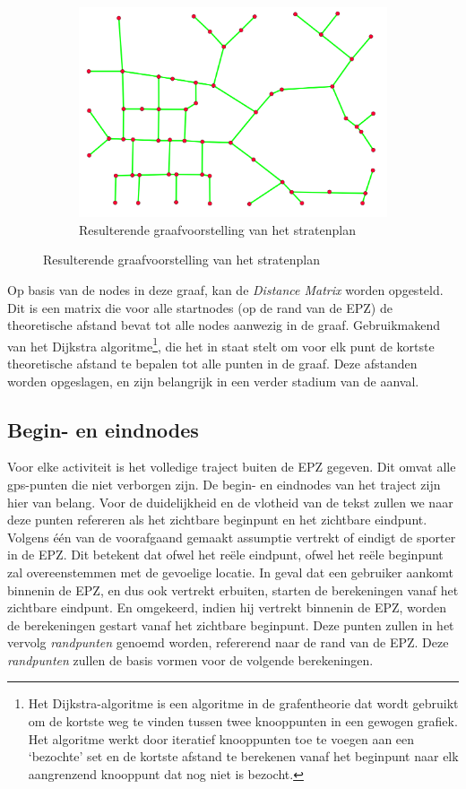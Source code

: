 \begin{figure}[h]
\begin{subfigure}[b]{.4\textwidth}
        \includegraphics[width=1\textwidth]{fig/RoadGraph/Graph.png}
        \caption{Resulterende graafvoorstelling van het stratenplan}
    \end{subfigure}
\end{figure}

Op basis van de nodes in deze graaf, kan de \textit{Distance Matrix} worden
opgesteld. Dit is een matrix die voor alle startnodes (op de rand van de
\ac{EPZ}) de theoretische afstand bevat tot alle nodes aanwezig in de graaf.
Gebruikmakend van het Dijkstra algoritme\footnote{Het Dijkstra-algoritme is een
    algoritme in de grafentheorie dat wordt gebruikt om de kortste weg te vinden
    tussen twee knooppunten in een gewogen grafiek. Het algoritme werkt door
    iteratief knooppunten toe te voegen aan een `bezochte' set en de kortste
    afstand te berekenen vanaf het beginpunt naar elk aangrenzend knooppunt dat nog
    niet is bezocht\cite{dijkstra}.}, die het in staat stelt om voor elk punt de
kortste theoretische afstand te bepalen tot alle punten in de graaf. Deze
afstanden worden opgeslagen, en zijn belangrijk in een verder stadium van de
aanval.

\subsection{Begin- en eindnodes}
Voor elke activiteit is het volledige traject buiten de \ac{EPZ} gegeven. Dit
omvat alle \ac{gps}-punten die niet verborgen zijn. De begin- en eindnodes van
het traject zijn hier van belang. Voor de duidelijkheid en de vlotheid van de
tekst zullen we naar deze punten refereren als het zichtbare beginpunt en het
zichtbare eindpunt. Volgens één van de voorafgaand gemaakt assumptie vertrekt
of eindigt de sporter in de \ac{EPZ}. Dit betekent dat ofwel het reële
eindpunt, ofwel het reële beginpunt zal overeenstemmen met de gevoelige
locatie. In geval dat een gebruiker aankomt binnenin de \ac{EPZ}, en dus ook
vertrekt erbuiten, starten de berekeningen vanaf het zichtbare eindpunt. En
omgekeerd, indien hij vertrekt binnenin de \ac{EPZ}, worden de berekeningen
gestart vanaf het zichtbare beginpunt. Deze punten zullen in het vervolg
\textit{randpunten} genoemd worden, refererend naar de rand van de \ac{EPZ}.
Deze \textit{randpunten} zullen de basis vormen voor de volgende berekeningen.

